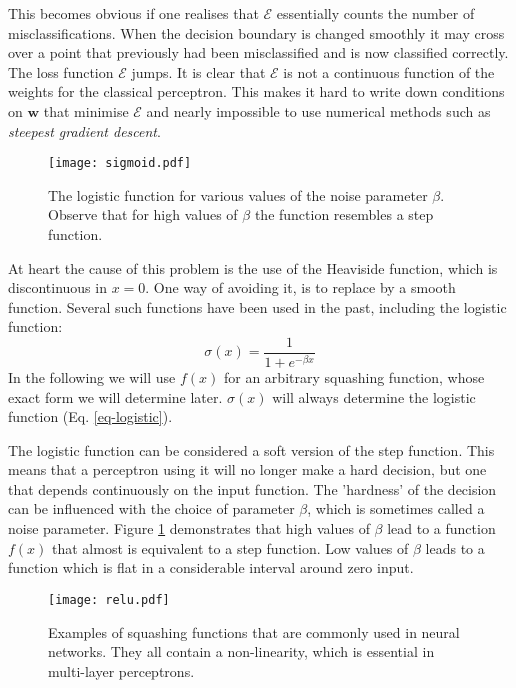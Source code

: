 This becomes obvious if one realises that $\mathcal{E}$ essentially counts the number of misclassifications. When the decision boundary is changed smoothly it may cross
over a point that previously had been misclassified and is now classified correctly. The loss function $\mathcal{E}$ jumps. It is clear that $\mathcal{E}$ is not
a continuous function of the weights for the classical perceptron. This makes it hard to write down conditions on $\boldsymbol{w}$ that minimise $\mathcal{E}$ and nearly
impossible to use numerical methods such as \emph{steepest gradient descent}.

\begin{figure}
  \begin{center}
    \texttt{[image: sigmoid.pdf]}
  \end{center}
  \caption{The logistic function for various values of the noise parameter $\beta$. Observe that for high values of $\beta$ the function
  resembles a step function.}
  \label{fig-logistic}
\end{figure}

At heart the cause of this problem is the use of the Heaviside function, which
is discontinuous in $x=0$. One way of avoiding it, is to replace by a smooth function.
Several such functions have been used in the past, including the logistic
function:
\begin{equation}
  \sigma(x) = \frac{1}{1+ e^{-\beta x}}
  \label{eq-logistic}
\end{equation}
In the following we will use $f(x)$ for an arbitrary squashing function, whose exact form we will determine later. $\sigma(x)$ will
always determine the logistic function (Eq. \ref{eq-logistic}).

The logistic function can be considered a soft version of the step function. This
means that a perceptron using  it will no longer make a hard decision, but one that
depends continuously on the input function. The 'hardness' of the decision
can be influenced with the choice of parameter $\beta$, which is sometimes
called a noise parameter.  Figure \ref{fig-logistic} demonstrates that high values
of $\beta$ lead to a function $f(x)$ that almost is equivalent to a step function.
Low values  of $\beta$ leads to a function which is flat in a considerable interval
around zero input.

\begin{figure}[!ht]
  \begin{center}
    \texttt{[image: relu.pdf]}
  \end{center}
  \caption{Examples of squashing functions that are commonly used in neural networks. They all contain a non-linearity, which
    is essential in multi-layer perceptrons.}
  \label{fig-relu}
\end{figure}

